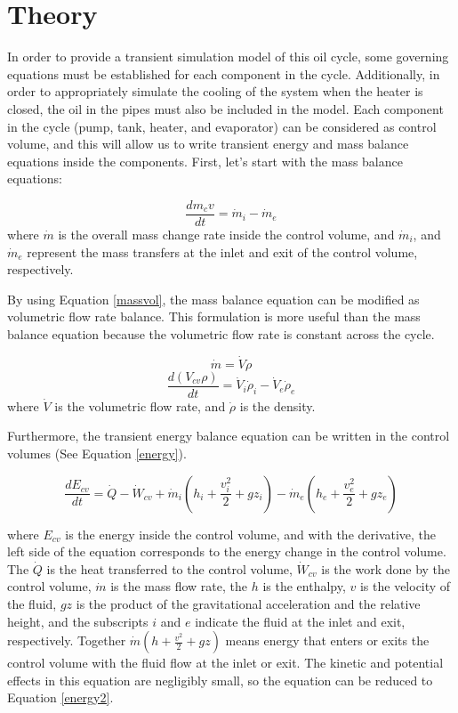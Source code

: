 \chapter{Theory}

In order to provide a transient simulation model of this oil cycle, some governing equations must be established for each component in the cycle. Additionally, in order to appropriately simulate the cooling of the system when the heater is closed, the oil in the pipes must also be included in the model. Each component in the cycle (pump, tank, heater, and evaporator) can be considered as control volume, and this will allow us to write transient energy and mass balance equations inside the components. First, let's start with the mass balance equations\cite{moran}:

	\begin{equation}
		\label{mass_balance}
		\frac{d m_cv}{dt} = \dot{m}_i - \dot{m}_e 
	\end{equation}
	\noindent
	where $\dot{m}$ is the overall mass change rate inside the control volume, and $\dot{m}_i$, and $\dot{m}_e$ represent the mass transfers at the inlet and exit of the control volume, respectively.
	
	By using Equation \ref{massvol}, the mass balance equation can be modified as volumetric flow rate balance. This formulation is more useful than the mass balance equation because the volumetric flow rate is constant across the cycle.
 
	\begin{equation}
		\label{massvol}
		\dot{m} = \dot{V} \rho
	\end{equation}
	\begin{equation}
		\label{massvol2}
		\frac{d (V_{cv} \rho)}{dt}= \dot{V}_i \dot{\rho}_i - \dot{V}_e \dot{\rho}_e
	\end{equation}
	\noindent
	where $\dot{V}$ is the volumetric flow rate, and $\dot{\rho}$ is the density.
	
	Furthermore, the transient energy balance equation can be written in the control volumes (See Equation \ref{energy}).
 
	\begin{equation}
		\label{energy}
		\frac{d E_{cv}}{dt}= \dot{Q} -  \dot{W}_{cv} +\dot{m}_i(h_i + \frac{v_i^2}{2} + gz_i) - \dot{m}_e(h_e + \frac{v_e^2}{2} + gz_e)
	\end{equation}

	\noindent
	where $ E_{cv}$ is the energy inside the control volume, and with the derivative, the left side of the equation corresponds to the energy change in the control volume. The $\dot{Q}$ is the heat transferred to the control volume, $\dot{W}_{cv}$ is the work done by the control volume, $\dot{m}$ is the mass flow rate, the $h$ is the enthalpy, $v$ is the velocity of the fluid, $gz$ is the product of the gravitational acceleration and the relative height, and the subscripts $i$ and $e$ indicate the fluid at the inlet and exit, respectively. Together $\dot{m}(h+ \frac{v^2}{2} + gz)$ means energy that enters or exits the control volume with the fluid flow at the inlet or exit. The kinetic and potential effects in this equation are negligibly small, so the equation can be reduced to Equation \ref{energy2}.
 
